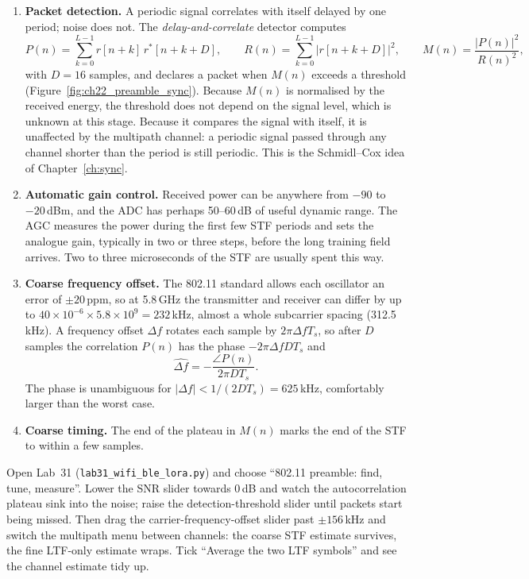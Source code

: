 \begin{enumerate}
\item \textbf{Packet detection.} A periodic signal correlates with itself delayed by one period;
noise does not. The \emph{delay-and-correlate} detector computes
\begin{equation}
P(n)=\sum_{k=0}^{L-1}r[n+k]\,r^*[n+k+D],\qquad
R(n)=\sum_{k=0}^{L-1}|r[n+k+D]|^2,\qquad
M(n)=\frac{|P(n)|^2}{R(n)^2},
\label{eq:ch22:sc}
\end{equation}
with $D=16$ samples, and declares a packet when $M(n)$ exceeds a threshold
(Figure~\ref{fig:ch22_preamble_sync}). Because $M(n)$ is normalised by the received energy, the
threshold does not depend on the signal level, which is unknown at this stage. Because it compares
the signal with itself, it is unaffected by the multipath channel: a periodic signal passed through
any channel shorter than the period is still periodic. This is the Schmidl--Cox idea of
Chapter~\ref{ch:sync}.
\item \textbf{Automatic gain control.} Received power can be anywhere from $-90$ to $-20$\,dBm, and
the ADC has perhaps 50--60\,dB of useful dynamic range. The AGC measures the power during the first
few STF periods and sets the analogue gain, typically in two or three steps, before the long
training field arrives. Two to three microseconds of the STF are usually spent this way.
\item \textbf{Coarse frequency offset.} The 802.11 standard allows each oscillator an error of
$\pm20$\,ppm, so at 5.8\,GHz the transmitter and receiver can differ by up to
$40\times10^{-6}\times5.8\times10^9=232$\,kHz, almost a whole subcarrier spacing (312.5\,kHz). A
frequency offset $\Delta f$ rotates each sample by $2\pi\Delta f T_s$, so after $D$ samples the
correlation $P(n)$ has the phase $-2\pi\Delta f DT_s$ and
\begin{equation}
\widehat{\Delta f}=-\frac{\angle P(n)}{2\pi DT_s}.
\label{eq:ch22:cfo}
\end{equation}
The phase is unambiguous for $|\Delta f|<1/(2DT_s)=625$\,kHz, comfortably larger than the worst
case.
\item \textbf{Coarse timing.} The end of the plateau in $M(n)$ marks the end of the STF to within a
few samples.
\end{enumerate}

\begin{tryit}
Open Lab~31 (\texttt{lab31\_wifi\_ble\_lora.py}) and choose ``802.11 preamble: find, tune, measure''.
Lower the SNR slider towards 0\,dB and watch the autocorrelation plateau sink into the noise; raise
the detection-threshold slider until packets start being missed. Then drag the carrier-frequency-offset
slider past $\pm156$\,kHz and switch the multipath menu between channels: the coarse STF estimate
survives, the fine LTF-only estimate wraps. Tick ``Average the two LTF symbols'' and see the
channel estimate tidy up.
\end{tryit}

